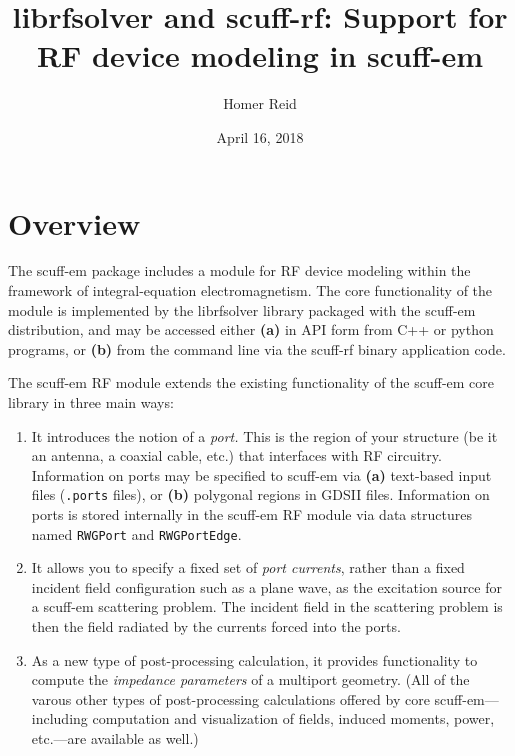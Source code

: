 \documentclass[letterpaper]{article}
\title {{\sc librfsolver} and {\sc scuff-rf}: Support for
        RF device modeling in {\sc scuff-em}}
\author {Homer Reid}
\date {April 16, 2018}
\begin{document}
\pagestyle{myheadings}
\maketitle

\tableofcontents

\section{Overview}

The {\sc scuff-em} package includes a module for RF device modeling
within the framework of integral-equation electromagnetism.
The core functionality of the module is implemented 
by the {\sc librfsolver} library packaged with the {\sc scuff-em}
distribution, and may be accessed either \textbf{(a)} in API form 
from C++ or python programs, or \textbf{(b)} from the command line
via the {\sc scuff-rf} binary application code.

The {\sc scuff-em} RF module extends the existing functionality of the
{\sc scuff-em} core library in three main ways:

\begin{enumerate}
  \item It introduces the notion of a \textit{port.} This is the region
        of your structure (be it an antenna, a coaxial cable, etc.)
        that interfaces with RF circuitry.
        Information on ports may be specified to {\sc scuff-em} via
        \textbf{(a)} text-based input files (\texttt{.ports} files), or
        \textbf{(b)} polygonal regions in GDSII files.
        Information on ports is stored internally in the {\sc scuff-em}
        RF module via data structures named \texttt{RWGPort} and 
        \texttt{RWGPortEdge}.
  \item It allows you to specify a fixed set of \textit{port currents},
        rather than a fixed incident field configuration such as a plane wave,
        as the excitation source for a {\sc scuff-em} scattering problem.
        The incident field in the scattering problem is then the field radiated
        by the currents forced into the ports.
  \item As a new type of post-processing calculation, it provides functionality 
        to compute the \textit{impedance parameters} of a multiport geometry.
        (All of the varous other types of post-processing calculations offered by
        core {\sc scuff-em}---including computation and visualization of fields,
        induced moments, power, etc.---are available as well.)
\end{enumerate}
\end{document}
